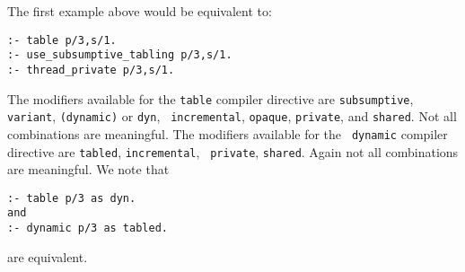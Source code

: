The first example above would be equivalent to:

\begin{verbatim}
:- table p/3,s/1.
:- use_subsumptive_tabling p/3,s/1.
:- thread_private p/3,s/1.

\end{verbatim}

The modifiers available for the {\tt table} compiler directive are
{\tt subsumptive}, {\tt variant}, {\tt (dynamic)} or {\tt dyn}, {\tt
incremental}, {\tt opaque}, {\tt private}, and {\tt shared}.  Not all
combinations are meaningful.  The modifiers available for the {\tt
dynamic} compiler directive are {\tt tabled}, {\tt incremental}, {\tt
private}, {\tt shared}.  Again not all combinations are meaningful.
We note that
\begin{verbatim}
:- table p/3 as dyn.
and
:- dynamic p/3 as tabled.
\end{verbatim}
are equivalent.
